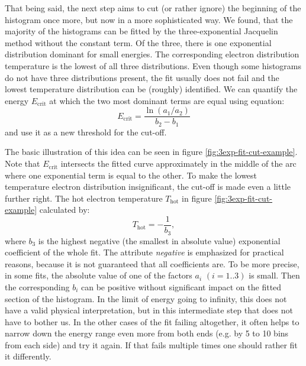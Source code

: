 That being said, the next step aims to cut (or rather ignore) the beginning of the histogram once more, but now in a more sophisticated way. We found, that the majority of the histograms can be fitted by the three-exponential Jacquelin method without the constant term. Of the three, there is one exponential distribution dominant for small energies. The corresponding electron distribution temperature is the lowest of all three distributions. Even though some histograms do not have three distributions present, the fit usually does not fail and the lowest temperature distribution can be (roughly) identified. We can quantify the energy $E_{\mathrm{crit}}$ at which the two most dominant terms are equal using equation:
\begin{equation}
	E_{\mathrm{crit}} = \frac{\ln{\left(a_1/a_2\right)}}{b_2-b_1}
\end{equation}
and use it as a new threshold for the cut-off. 

The basic illustration of this idea	 can be seen in figure \ref{fig:3exp-fit-cut-example}. Note that $E_{\mathrm{crit}}$ intersects the fitted curve approximately in the middle of the arc where one exponential term is equal to the other. To make the lowest temperature electron distribution insignificant, the cut-off is made even a little further right. The hot electron temperature $T_\mathrm{hot}$ in figure \ref{fig:3exp-fit-cut-example} calculated by:
\begin{equation}
	T_{\mathrm{hot}} = -\frac{1}{b_3},
\end{equation}
where $b_3$ is the highest negative (the smallest in absolute value) exponential coefficient of the whole fit. The attribute \textit{negative} is emphasized for practical reasons, because it is not guaranteed that all coefficients are. To be more precise, in some fits, the absolute value of one of the factors $a_i$ $(i=1..3)$ is small. Then the corresponding $b_i$ can be positive without significant impact on the fitted section of the histogram. In the limit of energy going to infinity, this does not have a valid physical interpretation, but in this intermediate step that does not have to bother us. In the other cases of the fit failing altogether, it often helps to narrow down the energy range even more from both ends (e.g. by 5 to 10 bins from each side) and try it again. If that fails multiple times one should rather fit it differently.
	
